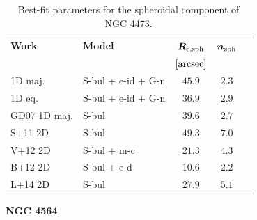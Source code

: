 \documentclass[preprint2]{emulateapj}
\begin{document}
  \begin{table}[h]
  \small
  \caption{Best-fit parameters for the spheroidal component of NGC 4473.}
  \begin{center}
  \begin{tabular}{llccc}
  \hline
  {\bf Work} & {\bf Model}   & $\bm R_{\rm e,sph}$    & $\bm n_{\rm sph}$ \\
    &  &  $[\rm arcsec]$ & \\
  \hline
  1D maj. & S-bul + e-id + G-n & $45.9$  &  $2.3$ \\
  1D eq.  & S-bul + e-id + G-n & $36.9$  &  $2.9$ \\
  \hline
  GD07 1D maj.      & S-bul                 & $39.6$   &  $2.7$ \\
  S+11 2D      & S-bul                 & $49.3$   &  $7.0$ \\
  V+12 2D      & S-bul + m-c           & $21.3$   &  $4.3$ \\
  B+12 2D      & S-bul + e-d           & $10.6$   &  $2.2$ \\
  L+14 2D      & S-bul                 & $27.9$   &  $5.1$ \\
  \hline
  \end{tabular}
  \end{center}
  \label{tab:n4459}
  \end{table}


  \clearpage\newpage\noindent
  {\bf NGC 4564 \\}
\end{document}
